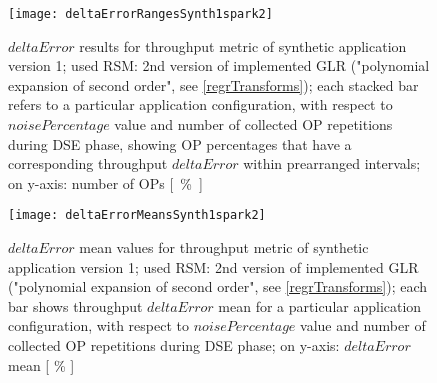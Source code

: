 \begin{figure}[h]

    \centering
    
    \texttt{[image: deltaErrorRangesSynth1spark2]}
    
     \caption[$deltaError$ results for throughput metric of synthetic application version 1; used RSM: 2nd version of implemented GLR ("polynomial expansion of second order")]{$deltaError$ results for throughput metric of synthetic application version 1; used RSM: 2nd version of implemented GLR ("polynomial expansion of second order", see \ref{regrTransforms}); each stacked bar refers to a particular application configuration, with respect to $noisePercentage$ value and number of collected OP repetitions during DSE phase, showing OP percentages that have a corresponding throughput $deltaError$ within prearranged intervals; on y-axis: number of OPs \hbox{[ \% ]}}
    
    \label{fig::synth1spark2::intervals}
    
\end{figure}

\begin{figure}[h]

    \centering
    
    \texttt{[image: deltaErrorMeansSynth1spark2]}
    
    \caption[$deltaError$ mean values for throughput metric of synthetic application version 1; used RSM: 2nd version of implemented GLR ("polynomial expansion of second order")]{$deltaError$ mean values for throughput metric of synthetic application version 1; used RSM: 2nd version of implemented GLR ("polynomial expansion of second order", see \ref{regrTransforms}); each bar shows throughput $deltaError$ mean for a particular application configuration, with respect to $noisePercentage$ value and number of collected OP repetitions during DSE phase; on y-axis: $deltaError$ mean [ \% ]}
    
    \label{fig::synth1spark2::means}
    
\end{figure}





